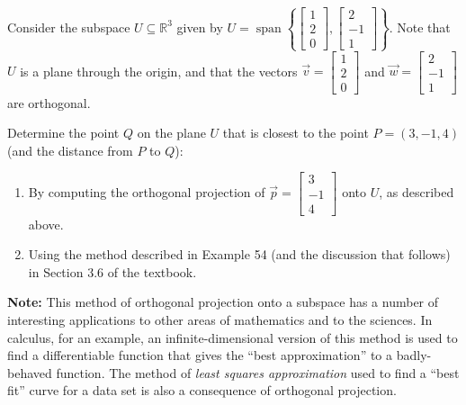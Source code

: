 \documentclass[letterpaper,12pt]{article}
\newcommand{\R}{\mathbb{R}}
\newcommand{\bbm}{\begin{bmatrix}}
\newcommand{\ebm}{\end{bmatrix}}
\begin{document}
\begin{enumerate}
Consider the subspace $U\subseteq \R^3$ given by $U = \operatorname{span}\left\{\bbm 1\\2\\0\ebm, \bbm 2\\-1\\1\ebm\right\}$. Note that $U$ is a plane through the origin, and that the vectors $\vec{v} = \bbm 1\\2\\0\ebm$ and $\vec{w}=\bbm 2\\-1\\1\ebm$ are orthogonal.

Determine the point $Q$ on the plane $U$ that is closest to the point $P=(3,-1,4)$ (and the distance from $P$ to $Q$):
\begin{enumerate}
 \item By computing the orthogonal projection of $\vec{p} = \bbm 3\\-1\\4\ebm$ onto $U$, as described above.
 \item Using the method described in Example 54 (and the discussion that follows) in Section 3.6 of the textbook.
\end{enumerate}

\textbf{Note:} This method of orthogonal projection onto a subspace has a number of interesting applications to other areas of mathematics and to the sciences. In calculus, for an example, an infinite-dimensional version of this method is used to find a differentiable function that gives the ``best approximation'' to a badly-behaved function. The method of \textit{least squares approximation} used to find a ``best fit'' curve for a data set is also a consequence of orthogonal projection.
\end{enumerate}
\end{document}
